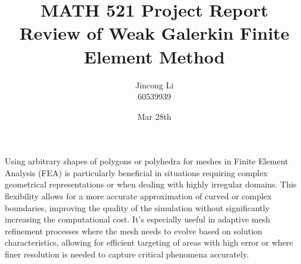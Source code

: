 \documentclass[a4paper,11pt]{article} %
\begin{document}
\setlength{\parskip}{1em} 
\setlength{\parindent}{0pt}
\newcommand{\vect}[1]{\mathbf{#1}}

\title{MATH 521 Project Report \\
Review of Weak Galerkin Finite Element Method}
\author{Jincong Li \\ 60539939}
\date{Mar 28th}
\maketitle

Using arbitrary shapes of polygons or polyhedra for meshes in Finite Element Analysis (FEA) 
is particularly beneficial in situations requiring complex geometrical representations or 
when dealing with highly irregular domains. This flexibility allows for a more accurate 
approximation of curved or complex boundaries, improving the quality of the simulation 
without significantly increasing the computational cost. It's especially useful in adaptive 
mesh refinement processes where the mesh needs to evolve based on solution characteristics, 
allowing for efficient targeting of areas with high error or where finer resolution is 
needed to capture critical phenomena accurately.
\end{document}
